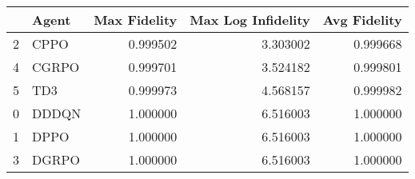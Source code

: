 \begin{tabular}{llrrr}
\toprule
 & Agent & Max Fidelity & Max Log Infidelity & Avg Fidelity \\
\midrule
2 & CPPO & 0.999502 & 3.303002 & 0.999668 \\
4 & CGRPO & 0.999701 & 3.524182 & 0.999801 \\
5 & TD3 & 0.999973 & 4.568157 & 0.999982 \\
0 & DDDQN & 1.000000 & 6.516003 & 1.000000 \\
1 & DPPO & 1.000000 & 6.516003 & 1.000000 \\
3 & DGRPO & 1.000000 & 6.516003 & 1.000000 \\
\bottomrule
\end{tabular}
